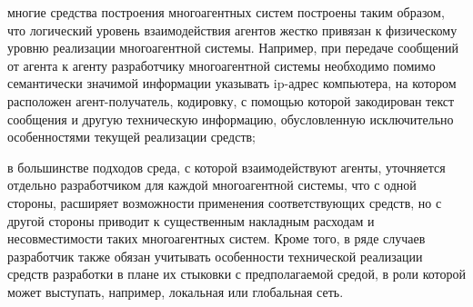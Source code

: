 \begin{SCn}
{\begin{scnitemize}
\item многие средства построения многоагентных систем построены таким образом, что логический уровень взаимодействия агентов жестко привязан к физическому уровню реализации многоагентной системы. Например, при передаче сообщений от агента к агенту разработчику многоагентной системы необходимо помимо семантически значимой информации указывать ip-адрес компьютера, на котором расположен агент-получатель, кодировку, с помощью которой закодирован текст сообщения и другую техническую информацию, обусловленную исключительно особенностями текущей реализации средств;
\item в большинстве подходов среда, с которой взаимодействуют агенты, уточняется отдельно разработчиком для каждой многоагентной системы, что с одной стороны, расширяет возможности применения соответствующих средств, но с другой стороны приводит к существенным накладным расходам и несовместимости таких многоагентных систем. Кроме того, в ряде случаев разработчик также обязан учитывать особенности технической реализации средств разработки в плане их стыковки с предполагаемой средой, в роли которой может выступать, например, локальная или глобальная сеть.
\end{scnitemize}}

\scnendstruct

\end{SCn}